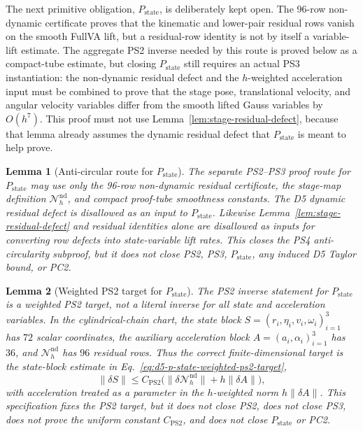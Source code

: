 \documentclass[preprint,12pt]{elsarticle}
\newtheorem{lemma}{Lemma}
\begin{document}
The next primitive obligation, \(P_{\mathrm{state}}\), is deliberately kept
open.  The 96-row non-dynamic certificate proves that the kinematic and
lower-pair residual rows vanish on the smooth FullVA lift, but a residual-row
identity is not by itself a variable-lift estimate.  The aggregate PS2 inverse
needed by this route is proved below as a compact-tube estimate, but closing
\(P_{\mathrm{state}}\) still requires an actual PS3 instantiation: the
non-dynamic residual defect and the \(h\)-weighted acceleration input must be
combined to prove that the stage pose, translational velocity, and angular
velocity variables differ from the smooth lifted Gauss variables by
\(O(h^7)\).  This proof must not use
Lemma~\ref{lem:stage-residual-defect}, because that lemma already assumes the
dynamic residual defect that \(P_{\mathrm{state}}\) is meant to help prove.

\begin{lemma}[Anti-circular route for \(P_{\mathrm{state}}\)]
\label{lem:d5-p-state-anticircularity}
The separate PS2--PS3 proof route for \(P_{\mathrm{state}}\) may use only the
96-row non-dynamic residual certificate, the stage-map definition
\(\mathcal N_h^{\mathrm{nd}}\), and compact proof-tube smoothness constants.
The D5 dynamic residual defect is disallowed as an input to
\(P_{\mathrm{state}}\).
Likewise Lemma~\ref{lem:stage-residual-defect} and residual identities alone are
disallowed as inputs for converting row defects into state-variable lift
rates. This closes the PS4 anti-circularity subproof, but it does not close
PS2, PS3, \(P_{\mathrm{state}}\), any induced D5 Taylor bound, or PC2.
\end{lemma}

\begin{lemma}[Weighted PS2 target for \(P_{\mathrm{state}}\)]
\label{lem:d5-p-state-ps2-weighted-target}
The PS2 inverse statement for \(P_{\mathrm{state}}\) is a weighted PS2 target,
not a literal inverse for all state and acceleration variables.  In the
cylindrical-chain chart, the state block
\(S=(r_i,\eta_i,v_i,\omega_i)_{i=1}^3\) has \(72\) scalar coordinates, the
auxiliary acceleration block \(A=(a_i,\alpha_i)_{i=1}^3\) has \(36\), and
\(\mathcal N_h^{\mathrm{nd}}\) has \(96\) residual rows.  Thus the correct
finite-dimensional target is the state-block estimate in
Eq.~\eqref{eq:d5-p-state-weighted-ps2-target},
\begin{equation}
\label{eq:d5-p-state-weighted-ps2-target}
\|\delta S\|\le C_{\mathrm{PS2}}
\bigl(\|\delta \mathcal N_h^{\mathrm{nd}}\|+h\|\delta A\|\bigr),
\end{equation}
with acceleration treated as a parameter in the \(h\)-weighted norm
\(h\|\delta A\|\).  This specification fixes the PS2 target, but it does not
close PS2, does not close PS3, does not prove the uniform constant
\(C_{\mathrm{PS2}}\), and does not close \(P_{\mathrm{state}}\) or PC2.
\end{lemma}
\end{document}
